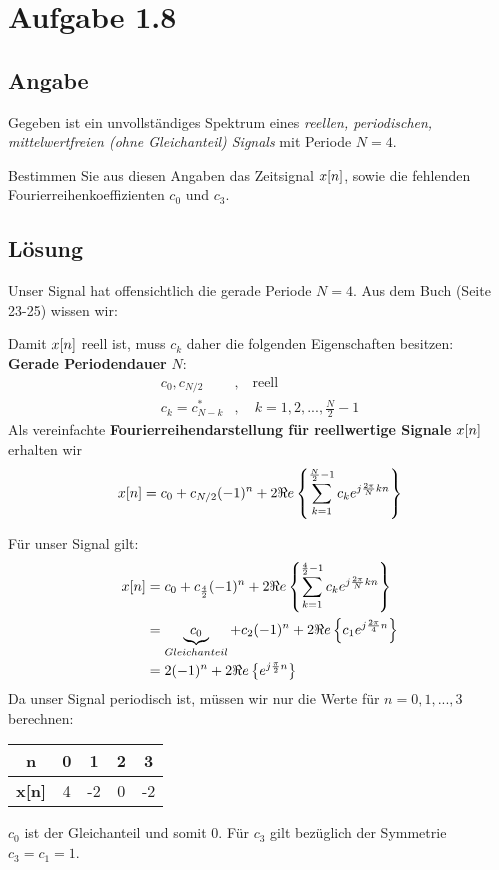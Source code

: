 \section*{Aufgabe 1.8}
\subsection*{Angabe}
Gegeben ist ein unvollständiges Spektrum eines \textit{reellen, periodischen, mittelwertfreien (ohne Gleichanteil) Signals} mit Periode $N=4$.
\begin{center}
\end{center}
Bestimmen Sie aus diesen Angaben das Zeitsignal $x\negthinspace\left[n\right]$, sowie die fehlenden Fourierreihenkoeffizienten $c_0$ und $c_3$.
\subsection*{Lösung}
Unser Signal hat offensichtlich die gerade Periode $N=4$. Aus dem Buch (Seite 23-25) wissen wir:
\begin{hint}
Damit $x\negthinspace\left[n\right]$ reell ist, muss $c_k$ daher die folgenden Eigenschaften besitzen:\\
\textbf{Gerade Periodendauer} $N$:
\begin{align*}
	c_0, c_{N/2}&,\quad \text{reell}\\
	c_k=c^*_{N-k}&,\quad k=1,2,...,\frac{N}{2}-1
\end{align*}
Als vereinfachte \textbf{Fourierreihendarstellung für reellwertige Signale} $x\negthinspace\left[n\right]$ erhalten wir
\[
	x\negthinspace\left[n\right]=c_0+c_{N/2}(-1)^n+2 \Re e 
	\left\{\sum_{k=1}^{\frac{N}{2}-1}c_k e^{j\frac{2\pi}{N}kn}\right\}
\]
\end{hint}
Für unser Signal gilt:
\begin{align*}
	x\negthinspace\left[n\right] &= c_0+c_\frac{4}{2} (-1)^n + 2 \Re e
	\left\{\sum_{k=1}^{\frac{4}{2}-1}c_k e^{j\frac{2\pi}{N}kn}\right\} \\
	&= \underbrace{c_0}_{Gleichanteil} + c_2 (-1)^n + 2 \Re e \left\{ c_1 e^{j\frac{2\pi}{4}n} \right\}\\
	&= 2 (-1)^n   + 2 \Re e \left\{ e^{j\frac{\pi}{2}n} \right\}
\end{align*}
Da unser Signal periodisch ist, müssen wir nur die Werte für $n=0,1,...,3$ berechnen:
\begin{center}
	\begin{tabular}{| c | c | c | c | c |}
	\hline
	\textbf{n} & 0 & 1 & 2 & 3 \\ \hline
	\textbf{x[n]} & 4 & -2 & 0 & -2 \\
	\hline
	\end{tabular}
\end{center}
$c_0$ ist der Gleichanteil und somit 0. Für $c_3$ gilt bezüglich der Symmetrie $c_3=c_1=1$.